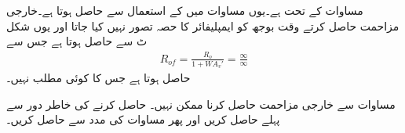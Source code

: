 مساوات  کے تحت  ہے۔یوں مساوات  میں  کے استعمال سے  حاصل ہوتا ہے۔خارجی مزاحمت  حاصل کرتے وقت بوجھ  کو ایمپلیفائر کا حصہ تصور نہیں کیا جاتا اور یوں شکل  ٹ سے  حاصل ہوتا ہے جس سے
\begin{align*} \label{مساوات_واپسی_تابع_مخارج_خارجی_مزاحمت_مسئلہ}
R_{of}=\frac{R_o}{1+W A_v'} =\frac{\infty}{\infty}
\end{align*}
حاصل ہوتا ہے جس کا کوئی مطلب نہیں۔

مساوات  سے خارجی مزاحمت حاصل کرنا ممکن نہیں۔ حاصل کرنے کی خاطر  دور سے پہلے  حاصل کریں اور پھر مساوات  کی مدد سے   حاصل کریں۔

